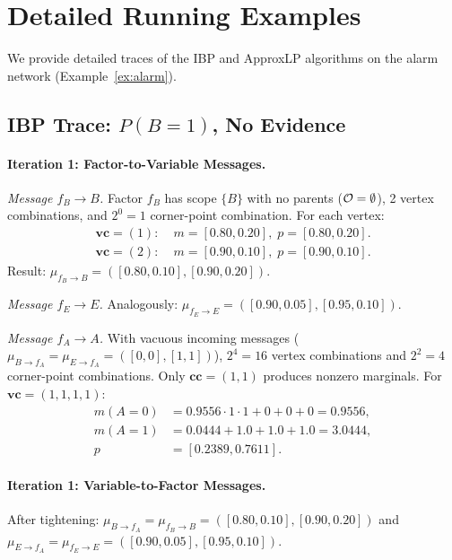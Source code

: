 \documentclass{article}
\begin{document}




\appendix

\section{Detailed Running Examples}
\label{app:examples}

We provide detailed traces of the IBP and ApproxLP algorithms on the alarm network (Example~\ref{ex:alarm}).

\subsection{IBP Trace: $P(B{=}1)$, No Evidence}

\paragraph{Iteration 1: Factor-to-Variable Messages.}

\emph{Message $f_B \to B$.}
Factor $f_B$ has scope $\{B\}$ with no parents ($\mathcal{O} = \emptyset$), 2 vertex combinations, and $2^0 = 1$ corner-point combination. For each vertex:
\begin{align*}
  \mathbf{vc} = (1): \; & m = [0.80, 0.20], \; p = [0.80, 0.20]. \\
  \mathbf{vc} = (2): \; & m = [0.90, 0.10], \; p = [0.90, 0.10].
\end{align*}
Result: $\mu_{f_B \to B} = ([0.80, 0.10], [0.90, 0.20])$.

\emph{Message $f_E \to E$.} Analogously: $\mu_{f_E \to E} = ([0.90, 0.05], [0.95, 0.10])$.

\emph{Message $f_A \to A$.} With vacuous incoming messages ($\mu_{B \to f_A} = \mu_{E \to f_A} = ([0,0],[1,1])$), $2^4 = 16$ vertex combinations and $2^2 = 4$ corner-point combinations. Only $\mathbf{cc} = (1,1)$ produces nonzero marginals. For $\mathbf{vc} = (1,1,1,1)$:
\begin{align*}
  m(A{=}0) &= 0.9556 \cdot 1 \cdot 1 + 0 + 0 + 0 = 0.9556, \\
  m(A{=}1) &= 0.0444 + 1.0 + 1.0 + 1.0 = 3.0444, \\
  p &= [0.2389, 0.7611].
\end{align*}

\paragraph{Iteration 1: Variable-to-Factor Messages.}
After tightening: $\mu_{B \to f_A} = \mu_{f_B \to B} = ([0.80, 0.10], [0.90, 0.20])$ and $\mu_{E \to f_A} = \mu_{f_E \to E} = ([0.90, 0.05], [0.95, 0.10])$.
\end{document}
